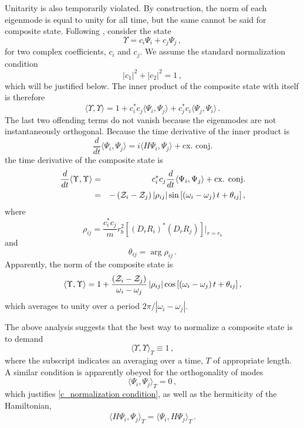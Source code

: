 \documentclass[pra,twocolumn,nofootinbib, superscriptaddress]{revtex4}%
\def\({\left(}
\def\){\right)}
\def\[{\left[}
\def\]{\right]}
\def\f#1#2{\frac{#1}{#2}}
\def\o{\omega}
\def\r{\rho}
\def\th{\theta}
\def\<{\langle}
\def\>{\rangle}
\providecommand{\abs}[1]{\left\lvert#1\right\rvert}
\begin{document}
 Unitarity is also temporarily violated. By construction, the norm of each eigenmode is equal to unity for all time, but the same cannot be said for composite state. Following \cite{Jacobs:2019woc}, consider the state
\begin{equation}
\Upsilon = c_i \Psi_i + c_j \Psi_j\,,
\end{equation}
for two complex coefficients, $c_i$ and $c_j$. We assume the standard normalization condition
\begin{equation}\label{c_normalization condition}
\abs{c_1}^2 + \abs{c_2}^2 = 1\,,
\end{equation}
which will be justified below. The inner product of the composite state with itself is therefore
\begin{equation}
\< \Upsilon, \Upsilon\> = 1 + c_i^*c_j \<\Psi_i,\Psi_j \> + c_j^*c_i \<\Psi_j,\Psi_i \>\,.
\end{equation}
The last two offending terms do not vanish because the eigenmodes are not instantaneously orthogonal. Because the time derivative of the inner product is
\begin{equation}
\f{d}{dt}\<\Psi_i,\Psi_j \> = i\<H\Psi_i,\Psi_j\> + \text{cx. conj.}%
\end{equation}
the time derivative of the composite state is
\begin{eqnarray}
\f{d}{dt}\< \Upsilon, \Upsilon\> &=& c_i^*c_j\f{d}{dt} \<\Psi_i,\Psi_j \> + \text{cx. conj.}\notag\\
&=&  -\({\cal Z}_i-{\cal Z}_j\)\abs{\r_{ij}} \sin{\[\(\o_i-\o_j\)t+ \th_{ij}\]}\,,
\end{eqnarray}
where
\begin{equation}
\r_{ij}=\f{c_i^*c_j}{m}r_b^2   \[\(D_rR_i\)^*\(D_rR_j\)  \] \bigg|_{r=r_b}
\end{equation}
and
\begin{equation}
\th_{ij}=\arg{\r_{ij}}\,.
\end{equation}
Apparently, the norm of the composite state is
\begin{equation}
\< \Upsilon, \Upsilon\> = 1 + \f{\({\cal Z}_i-{\cal Z}_j\)}{\o_i-\o_j} \abs{\r_{ij}} \cos{\[\(\o_i-\o_j\)t+ \th_{ij}\]}\,,
\end{equation}
which averages to unity over a period $2\pi/\abs{\o_i-\o_j}$.

The above analysis suggests that the best way to normalize a composite state is to demand
\begin{equation}
\< \Upsilon, \Upsilon\>_T \equiv 1\,,
\end{equation}
where the subscript indicates an averaging over a time, $T$ of appropriate length. A similar condition is apparently obeyed for the orthogonality of modes
\begin{equation}
\<\Psi_i,\Psi_j\>_T = 0\,,
\end{equation}
which justifies \eqref{c_normalization condition},  as well as the hermiticity of the Hamiltonian, 
\begin{eqnarray}
\<H\Psi_i,\Psi_j\>_T = \<\Psi_i,H\Psi_j\>_T \,.
\end{eqnarray}
\end{document}
